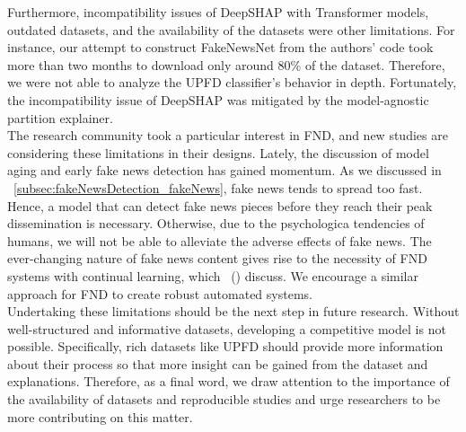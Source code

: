 Furthermore, incompatibility issues of DeepSHAP with Transformer models, outdated datasets, and the availability of the datasets were other limitations. For instance, our attempt to construct FakeNewsNet from the authors' code took more than two months to download only around 80\% of the dataset. Therefore, we were not able to analyze the UPFD classifier's behavior in depth. Fortunately, the incompatibility issue of DeepSHAP was mitigated by the model-agnostic partition explainer.\\
The research community took a particular interest in FND, and new studies are considering these limitations in their designs. Lately, the discussion of model aging and early fake news detection has gained momentum. As we discussed in ~\ref{subsec:fakeNewsDetection_fakeNews}, fake news tends to spread too fast. Hence, a model that can detect fake news pieces before they reach their peak dissemination is necessary. Otherwise, due to the psychologica tendencies of humans, we will not be able to alleviate the adverse effects of fake news. The ever-changing nature of fake news content gives rise to the necessity of FND systems with continual learning, which~\citeauthor{GraphNeuralNetworksWithContinualLearningFakeNewsDetection_Han} (\citeyear{GraphNeuralNetworksWithContinualLearningFakeNewsDetection_Han}) discuss. We encourage a similar approach for FND to create robust automated systems.\\
Undertaking these limitations should be the next step in future research. Without well-structured and informative datasets, developing a competitive model is not possible. Specifically, rich datasets like UPFD should provide more information about their process so that more insight can be gained from the dataset and explanations. Therefore, as a final word, we draw attention to the importance of the availability of datasets and reproducible studies and urge researchers to be more contributing on this matter.